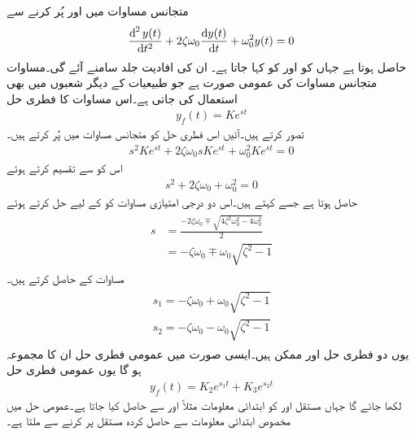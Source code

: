 متجانس مساوات میں  اور  پُر کرنے سے
\begin{align}\label{مساوات_عارضی_دو_درجی_عمومی_ہم_جنسی_ب}
\frac{\dif^{\,2} y(t)}{\dif t^2}+2\zeta \omega_0\frac{\dif y(t)}{\dif t}+\omega_0^2 y(t)=0
\end{align}
حاصل ہوتا ہے جہاں  کو 
 اور  کو  کہا جاتا ہے۔ ان کی افادیت جلد سامنے آئے گی۔مساوات   متجانس مساوات کی عمومی صورت ہے جو طبیعیات کے دیگر شعبوں میں بھی استعمال کی جاتی ہے۔اس مساوات کا فطری حل
\begin{align*}
y_f(t)=Ke^{st}
\end{align*}
تصور کرتے ہیں۔آئیں اس فطری حل کو متجانس مساوات میں پُر کرتے ہیں۔
\begin{align*}
s^2 K e^{st}+2\zeta\omega_0 s K e^{st}+\omega_0^2 K e^{st}=0
\end{align*}
اس کو  سے تقسیم کرتے ہوئے
\begin{align}
s^2+2\zeta\omega_0+\omega_0^2=0
\end{align}
حاصل ہوتا ہے جسے  کہتے ہیں۔اس دو درجی امتیازی مساوات کو  کے لیے حل کرتے ہوئے
\begin{gather}
\begin{aligned}
s&=\frac{-2\zeta\omega_0\mp\sqrt{4\zeta^2\omega_0^2-4\omega_0^2}}{2}\\
&=-\zeta\omega_0\mp \omega_0\sqrt{\zeta^2-1}
\end{aligned}
\end{gather}
مساوات کے  حاصل کرتے ہیں۔
\begin{gather}
\begin{aligned}\label{مساوات_عارضی_دو_درجی_ہم_سمتی_عمومی_حل_الف}
s_1=-\zeta\omega_0+ \omega_0\sqrt{\zeta^2-1}\\
s_2=-\zeta\omega_0- \omega_0\sqrt{\zeta^2-1}
\end{aligned}
\end{gather}
یوں دو فطری حل  اور  ممکن ہیں۔ایسی صورت میں عمومی فطری حل ان کا مجموعہ ہو گا
یوں عمومی فطری حل
\begin{align}
y_f(t)=K_2 e^{s_1 t}+K_3 e^{s_2 t}
\end{align}
لکھا جائے گا جہاں مستقل  اور  کو ابتدائی معلومات مثلاً  اور  سے حاصل کیا جاتا ہے۔عمومی حل میں مخصوص ابتدائی معلومات سے حاصل کردہ مستقل پر کرنے سے  ملتا ہے۔

